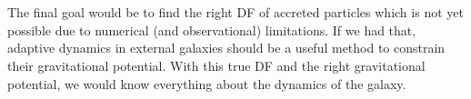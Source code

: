 \\\\The final goal would be to find the right \ac{DF} of accreted particles which is not yet possible due to numerical (and observational) limitations. If we had that, adaptive dynamics in external galaxies should be a useful method to constrain their gravitational potential. With this true \ac{DF} and the right gravitational potential, we would know everything about the dynamics of the galaxy.

